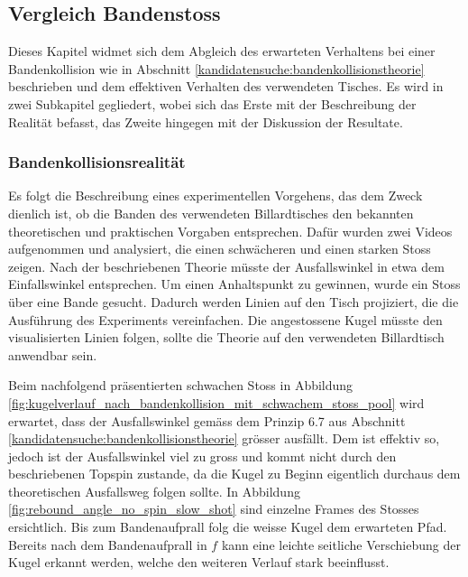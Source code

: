 \newpage
\subsection{Vergleich Bandenstoss}
Dieses Kapitel widmet sich dem Abgleich des erwarteten Verhaltens bei einer Bandenkollision wie in
Abschnitt \ref{kandidatensuche:bandenkollisionstheorie} beschrieben und dem effektiven Verhalten des verwendeten Tisches.
Es wird in zwei Subkapitel gegliedert, wobei sich das Erste mit der Beschreibung der Realität befasst, das Zweite hingegen
mit der Diskussion der Resultate.

\subsubsection{Bandenkollisionsrealität}
Es folgt die Beschreibung eines experimentellen Vorgehens, das dem Zweck dienlich ist, ob die Banden des verwendeten Billardtisches den
bekannten theoretischen und praktischen Vorgaben entsprechen. Dafür wurden zwei Videos aufgenommen und analysiert,
die einen schwächeren und einen starken Stoss zeigen.
Nach der beschriebenen Theorie müsste der Ausfallswinkel in etwa dem Einfallswinkel entsprechen.
Um einen Anhaltspunkt zu gewinnen, wurde ein Stoss
über eine Bande gesucht. Dadurch werden Linien auf den Tisch projiziert, die die Ausführung des Experiments vereinfachen.
Die angestossene Kugel müsste den visualisierten Linien folgen, sollte die Theorie auf den verwendeten Billardtisch
anwendbar sein.

Beim nachfolgend präsentierten schwachen Stoss in Abbildung \ref{fig:kugelverlauf_nach_bandenkollision_mit_schwachem_stoss_pool} wird erwartet, dass der Ausfallswinkel gemäss dem Prinzip 6.7 aus
Abschnitt \ref{kandidatensuche:bandenkollisionstheorie} grösser ausfällt. Dem ist effektiv so, jedoch ist
der Ausfallswinkel viel zu gross und kommt nicht durch den beschriebenen Topspin zustande, da die Kugel zu Beginn
eigentlich durchaus dem theoretischen Ausfallsweg folgen sollte. In Abbildung \ref{fig:rebound_angle_no_spin_slow_shot} sind
einzelne Frames des Stosses ersichtlich. Bis zum Bandenaufprall folg die weisse Kugel dem erwarteten Pfad. Bereits nach
dem Bandenaufprall in $f$ kann eine leichte seitliche Verschiebung der Kugel erkannt werden, welche den weiteren Verlauf
stark beeinflusst.

